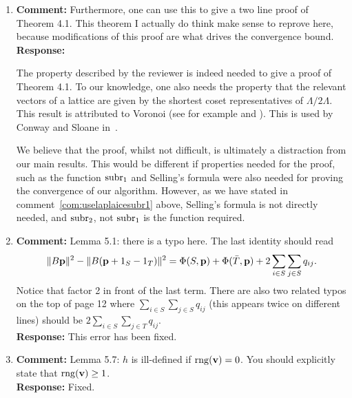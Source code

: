 \documentclass[a4paper,10pt]{article}
\begin{document}
\begin{enumerate}

\item\textbf{Comment:} \label{com:provethm4.1}
Furthermore, one can use this to give a two line proof of Theorem 4.1.  This theorem I actually do think make sense to reprove here, because modifications of this proof are what drives the convergence bound. 
\\\textbf{Response:}

The property described by the reviewer is indeed needed to give a proof of Theorem 4.1.  To our knowledge, one also needs the property that the relevant vectors of a lattice are given by the shortest coset representatives of $\Lambda / 2\Lambda$.  This result is attributed to Voronoi (see for example \cite[Theorem~2]{ConwaySloane1992_voronoi_lattice_3d_obtuse_superbases} and \cite[Theorem~3.2]{MicciancioVoulgaris_deterministic_jv_2013}).  This is used by Conway and Sloane in~\cite[Theorem~3]{ConwaySloane1992_voronoi_lattice_3d_obtuse_superbases}.

We believe that the proof, whilst not difficult, is ultimately a distraction from our main results.  This would be different if properties needed for the proof, such as the function $\operatorname{subr}_1$ and Selling's formula were also needed for proving the convergence of our algorithm.  However, as we have stated in comment~\ref{com:uselaplaicesubr1} above, Selling's formula is not directly needed, and $\operatorname{subr}_2$, not $\operatorname{subr}_1$ is the function required. 


\item\textbf{Comment:} 
Lemma 5.1: there is a typo here.  The last identity should read
\[
\|B\mathbf{p}\|^2 - \|B(\mathbf{p} + 1_S - 1_T)\|^2 = \Phi(S,\mathbf{p}) + \Phi(\bar{T}, \mathbf{p}) + 2\sum_{i \in S}\sum_{j\in S} q_{ij}.
\]
Notice that factor 2 in front of the last term.  There are also two related typos on the top of page 12 where $\sum_{i \in S}\sum_{j\in S} q_{ij}$ (this appears twice on different lines) should be $2\sum_{i \in S}\sum_{j\in T} q_{ij}$.
\\\textbf{Response:}
This error has been fixed.


\item\textbf{Comment:} 
Lemma 5.7: $h$ is ill-defined if $\operatorname{rng}(\mathbf{v}) = 0$.  You should explicitly state that $\operatorname{rng}(\mathbf{v}) \geq 1$.
\\\textbf{Response:}
Fixed.


\end{enumerate}
\end{document}
